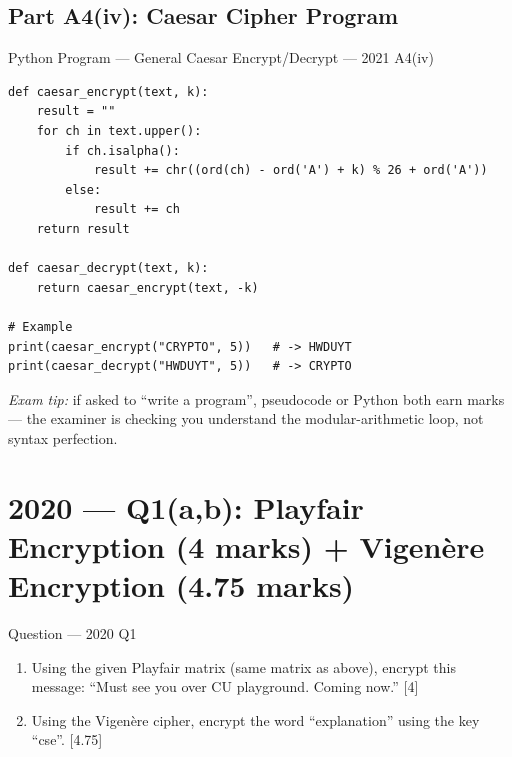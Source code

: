 \documentclass[12pt,a4paper]{article}
\begin{document}
\subsection{Part A4(iv): Caesar Cipher Program}
\begin{solbox}{Python Program --- General Caesar Encrypt/Decrypt --- 2021 A4(iv)}
\begin{verbatim}
def caesar_encrypt(text, k):
    result = ""
    for ch in text.upper():
        if ch.isalpha():
            result += chr((ord(ch) - ord('A') + k) % 26 + ord('A'))
        else:
            result += ch
    return result

def caesar_decrypt(text, k):
    return caesar_encrypt(text, -k)

# Example
print(caesar_encrypt("CRYPTO", 5))   # -> HWDUYT
print(caesar_decrypt("HWDUYT", 5))   # -> CRYPTO
\end{verbatim}
\textit{Exam tip:} if asked to ``write a program'', pseudocode or Python both earn marks --- the examiner is checking you understand the modular-arithmetic loop, not syntax perfection.
\end{solbox}

\newpage
\section{2020 --- Q1(a,b): Playfair Encryption (4 marks) + Vigen\`ere Encryption (4.75 marks)}

\begin{qbox}{Question --- 2020 Q1}
\begin{enumerate}[label=(\alph*)]
  \item Using the given Playfair matrix (same matrix as above), encrypt this message: ``Must see you over CU playground. Coming now.'' \hfill [4]
  \item Using the Vigen\`ere cipher, encrypt the word ``explanation'' using the key ``cse''. \hfill [4.75]
\end{enumerate}
\end{qbox}
\end{document}
